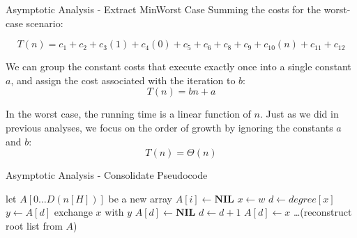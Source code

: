 \documentclass{beamer}
\begin{document}
\begin{frame}{Asymptotic Analysis - Extract Min}{Worst Case}
    Summing the costs for the worst-case scenario:
    
    $$T(n) = c_1 + c_2 + c_3(1) + c_4(0) + c_5 + c_6 + c_8 + c_9 + c_{10}(n) + c_{11} + c_{12}$$
    
    \vspace{0.1cm}
    We can group the constant costs that execute exactly once into a single constant $a$, and assign the cost associated with the  iteration to $b$:
    $$T(n) = bn + a$$
    
    \vspace{0.1cm}
    In the worst case, the running time is a linear function of $n$. Just as we did in previous analyses, we focus on the order of growth by ignoring the constants $a$ and $b$:
    $$T(n) = \Theta(n)$$
\end{frame}

\begin{frame}{Asymptotic Analysis - Consolidate Pseudocode}
    \scriptsize
    \begin{algorithmic}[1]
            \State let $A[0 \dots D(n[H])]$ be a new array
                \State $A[i] \gets \textbf{NIL}$
            \EndFor
                \State $x \gets w$
                \State $d \gets degree[x]$
                    \State $y \gets A[d]$
                        \State exchange $x$ with $y$
                    \EndIf
                    \State {}
                    \State $A[d] \gets \textbf{NIL}$
                    \State $d \gets d + 1$
                \EndWhile
                \State $A[d] \gets x$
            \EndFor
            \State \dots (reconstruct root list from $A$)
        \EndFunction
    \end{algorithmic}
\end{frame}
\end{document}
